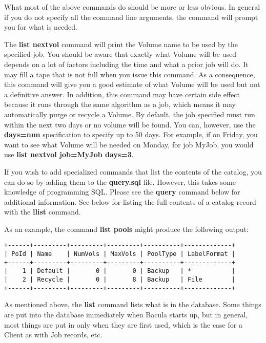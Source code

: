 \begin{description}
   What most of the above commands do should be more or less obvious.  In
   general if you do not specify all the command line arguments, the
   command will prompt you for what is needed.

   The {\bf list nextvol} command will print the Volume name to be used by
   the specified job.  You should be aware that exactly what Volume will be
   used depends on a lot of factors including the time and what a prior job
   will do.  It may fill a tape that is not full when you issue this
   command.  As a consequence, this command will give you a good estimate
   of what Volume will be used but not a definitive answer.  In addition,
   this command may have certain side effect because it runs through the
   same algorithm as a job, which means it may automatically purge or
   recycle a Volume. By default, the job specified must run within the
   next two days or no volume will be found. You can, however, use the
   {\bf days=nnn} specification to specify up to 50 days. For example,
   if on Friday, you want to see what Volume will be needed on Monday,
   for job MyJob, you would use {\bf list nextvol job=MyJob days=3}.

   If you wish to add specialized commands that list the contents of the
   catalog, you can do so by adding them to the {\bf query.sql} file.
   However, this takes some knowledge of programming SQL. Please see the
   {\bf query} command below for additional information.  See below for
   listing the full contents of a catalog record with the {\bf llist}
   command.

   As an example, the command {\bf list pools} might produce  the following
   output:

\footnotesize
\begin{verbatim}
+------+---------+---------+---------+----------+-------------+
| PoId | Name    | NumVols | MaxVols | PoolType | LabelFormat |
+------+---------+---------+---------+----------+-------------+
|    1 | Default |       0 |       0 | Backup   | *           |
|    2 | Recycle |       0 |       8 | Backup   | File        |
+------+---------+---------+---------+----------+-------------+
\end{verbatim}
\normalsize

   As mentioned above, the {\bf list} command lists what is in the
   database.  Some things are put into the database immediately when Bacula
   starts up, but in general, most things are put in only when they are
   first used, which is the case for a Client as with Job records, etc.


\end{description}
